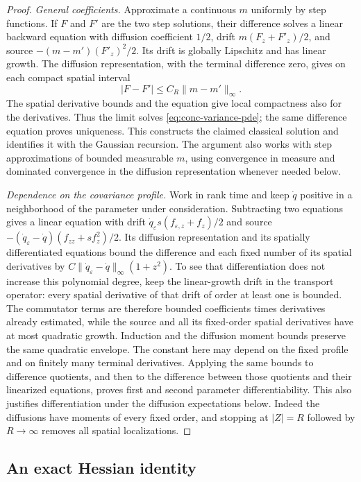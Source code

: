 \documentclass[11pt,a4paper]{article}
\numberwithin{equation}{section}
\theoremstyle{definition}
\theoremstyle{remark}
\begin{document}
\begin{proof}
\emph{General coefficients.}
Approximate a continuous $m$ uniformly by step functions.  If $F$ and $F'$
are the two step solutions, their difference solves a linear backward
equation with diffusion coefficient $1/2$, drift
$m(F_z+F'_z)/2$, and source
$-(m-m')(F'_z)^2/2$.  Its drift is globally Lipschitz and has linear growth.
The diffusion representation, with the terminal difference zero, gives on
each compact spatial interval
\[
 |F-F'|\leq C_R\|m-m'\|_\infty.
\]
The spatial derivative bounds and the equation give local compactness also
for the derivatives.  Thus the limit solves
\eqref{eq:conc-variance-pde}; the same difference equation proves uniqueness.
This constructs the claimed classical solution and identifies it with the
Gaussian recursion.  The argument also works with step approximations of
bounded measurable $m$, using convergence in measure and dominated
convergence in the diffusion representation whenever needed below.

\emph{Dependence on the covariance profile.}
Work in rank time and keep $\dot q$ positive in a neighborhood of
the parameter under consideration.  Subtracting two equations gives a
linear equation with drift
$\dot q_{\varepsilon}s(f_{\varepsilon,z}+f_z)/2$ and source
$-(\dot q_{\varepsilon}-\dot q)(f_{zz}+s f_z^2)/2$.
Its diffusion representation and its spatially differentiated equations
bound the difference and each fixed number of its spatial derivatives by
$C\|\dot q_{\varepsilon}-\dot q\|_\infty(1+z^2)$.
To see that differentiation does not increase this polynomial degree, keep
the linear-growth drift in the transport operator: every spatial derivative
of that drift of order at least one is bounded.  The commutator terms are
therefore bounded coefficients times derivatives already estimated, while
the source and all its fixed-order spatial derivatives have at most
quadratic growth.  Induction and the diffusion moment bounds preserve the
same quadratic envelope.
The constant here may depend on the fixed profile and on finitely many
terminal derivatives.  Applying the same bounds to difference quotients,
and then to the difference between those quotients and their linearized
equations, proves first and second parameter differentiability.  This
also justifies differentiation under the diffusion expectations below.
Indeed the diffusions have moments of every fixed order, and stopping at
$|Z|=R$ followed by $R\to\infty$ removes all spatial localizations.
\end{proof}

\subsection{An exact Hessian identity}
\end{document}
